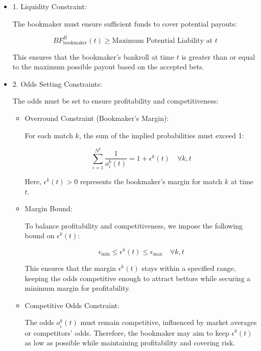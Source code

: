 \begin{itemize}
    \item 1. Liquidity Constraint:
    
       The bookmaker must ensure sufficient funds to cover potential payouts:
    
       \[
       BF_{\text{bookmaker}}^B(t) \geq \text{Maximum Potential Liability at } t
       \]
    
       This ensures that the bookmaker's bankroll at time \( t \) is greater than or equal to the maximum possible payout based on the accepted bets.
    
    \item 2. Odds Setting Constraints:
    
       The odds must be set to ensure profitability and competitiveness:
    
       \begin{itemize}
          \item Overround Constraint (Bookmaker's Margin):
    
            For each match \( k \), the sum of the implied probabilities must exceed 1:
    
            \[
            \sum_{i=1}^{N^k} \frac{1}{o_i^k(t)} = 1 + \epsilon^k(t) \quad \forall k, t
            \]
    
            Here, \( \epsilon^k(t) > 0 \) represents the bookmaker's margin for match \( k \) at time \( t \).
    
          \item Margin Bound:
    
            To balance profitability and competitiveness, we impose the following bound on \( \epsilon^k(t) \):
    
            \[
            \epsilon_{\text{min}} \leq \epsilon^k(t) \leq \epsilon_{\text{max}} \quad \forall k, t
            \]
    
            This ensures that the margin \( \epsilon^k(t) \) stays within a specified range, keeping the odds competitive enough to attract bettors while securing a minimum margin for profitability.
          
          \item Competitive Odds Constraint:
    
            The odds \( o_i^k(t) \) must remain competitive, influenced by market averages or competitors' odds. Therefore, the bookmaker may aim to keep \( \epsilon^k(t) \) as low as possible while maintaining profitability and covering risk.
       \end{itemize}
\end{itemize}

